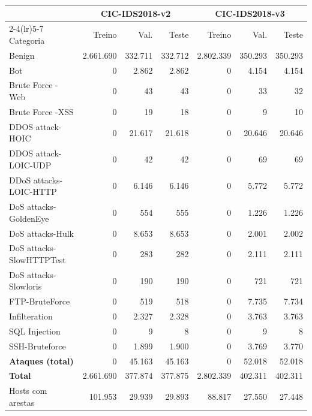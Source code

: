 \begin{tabular}{l rrr rrr}
\toprule
& \multicolumn{3}{c}{CIC-IDS2018-v2} & \multicolumn{3}{c}{CIC-IDS2018-v3} \\
\cmidrule(lr){2-4}\cmidrule(lr){5-7}
Categoria & Treino & Val. & Teste & Treino & Val. & Teste \\
\midrule
Benign & 2.661.690 & 332.711 & 332.712 & 2.802.339 & 350.293 & 350.293 \\
Bot & 0 & 2.862 & 2.862 & 0 & 4.154 & 4.154 \\
Brute Force -Web & 0 & 43 & 43 & 0 & 33 & 32 \\
Brute Force -XSS & 0 & 19 & 18 & 0 & 9 & 10 \\
DDOS attack-HOIC & 0 & 21.617 & 21.618 & 0 & 20.646 & 20.646 \\
DDOS attack-LOIC-UDP & 0 & 42 & 42 & 0 & 69 & 69 \\
DDoS attacks-LOIC-HTTP & 0 & 6.146 & 6.146 & 0 & 5.772 & 5.772 \\
DoS attacks-GoldenEye & 0 & 554 & 555 & 0 & 1.226 & 1.226 \\
DoS attacks-Hulk & 0 & 8.653 & 8.653 & 0 & 2.001 & 2.002 \\
DoS attacks-SlowHTTPTest & 0 & 283 & 282 & 0 & 2.111 & 2.111 \\
DoS attacks-Slowloris & 0 & 190 & 190 & 0 & 721 & 721 \\
FTP-BruteForce & 0 & 519 & 518 & 0 & 7.735 & 7.734 \\
Infilteration & 0 & 2.327 & 2.328 & 0 & 3.763 & 3.763 \\
SQL Injection & 0 & 9 & 8 & 0 & 9 & 8 \\
SSH-Bruteforce & 0 & 1.899 & 1.900 & 0 & 3.769 & 3.770 \\
\midrule
\textbf{Ataques (total)} & 0 & 45.163 & 45.163 & 0 & 52.018 & 52.018 \\
\textbf{Total} & 2.661.690 & 377.874 & 377.875 & 2.802.339 & 402.311 & 402.311 \\
\midrule
Hosts com arestas & 101.953 & 29.939 & 29.893 & 88.817 & 27.550 & 27.448 \\
\bottomrule
\end{tabular}
